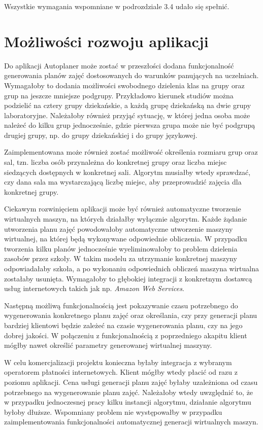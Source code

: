 Wszystkie wymagania wspomniane w podrozdziale 3.4 udało się spełnić.


\section{Możliwości rozwoju aplikacji}

Do aplikacji Autoplaner może zostać w przeszłości dodana funkcjonalność generowania planów zajęć dostosowanych do warunków panujących na uczelniach. Wymagałoby to dodania możliwości swobodnego dzielenia klas na grupy oraz grup na jeszcze mniejsze podgrupy. Przykładowo kierunek studiów można podzielić na cztery grupy dziekańskie, a każdą grupę dziekańską na dwie grupy laboratoryjne. Należałoby również przyjąć sytuację, w której jedna osoba może należeć do kilku grup jednocześnie, gdzie pierwsza grupa może nie być podgrupą drugiej grupy, np. do grupy dziekańskiej i do grupy językowej.

Zaimplementowana może również zostać możliwość określenia rozmiaru grup oraz sal, tzn. liczba osób przynależna do konkretnej grupy oraz liczba miejsc siedzących dostępnych w konkretnej sali. Algorytm musiałby wtedy sprawdzać, czy dana sala ma wystarczającą liczbę miejsc, aby przeprowadzić zajęcia dla konkretnej grupy.

Ciekawym rozwinięciem aplikacji może być również automatyczne tworzenie wirtualnych maszyn, na których działałby wyłącznie algorytm. Każde żądanie utworzenia planu zajęć powodowałoby automatyczne utworzenie maszyny wirtualnej, na której będą wykonywane odpowiednie obliczenia. W przypadku tworzenia kilku planów jednocześnie wyeliminowałoby to problem dzielenia zasobów przez szkoły. W takim modelu za utrzymanie konkretnej maszyny odpowiadałaby szkoła, a po wykonaniu odpowiednich obliczeń maszyna wirtualna zostałaby usunięta. Wymagałoby to głębokiej integracji z konkretnym dostawcą usług internetowych takich jak np. \textit{Amazon Web Services}.

Następną możliwą funkcjonalnością jest pokazywanie czasu potrzebnego do wygenerowania konkretnego planu zajęć oraz określania, czy przy generacji planu bardziej klientowi będzie zależeć na czasie wygenerowania planu, czy na jego dobrej jakości. W połączeniu z funkcjonalnością z poprzedniego akapitu klient mógłby nawet określić parametry generowanej wirtualnej maszyny.

W celu komercjalizacji projektu konieczna byłaby integracja z wybranym operatorem płatności internetowych. Klient mógłby wtedy płacić od razu z poziomu aplikacji. Cena usługi generacji planu zajęć byłaby uzależniona od czasu potrzebnego na wygenerowanie planu zajęć. Należałoby wtedy uwzględnić to, że w przypadku jednoczesnej pracy kilku instancji algorytmu, działanie algorytmu byłoby dłuższe. Wspomniany problem nie występowałby w przypadku zaimplementowania funkcjonalności automatycznej generacji wirtualnych maszyn.